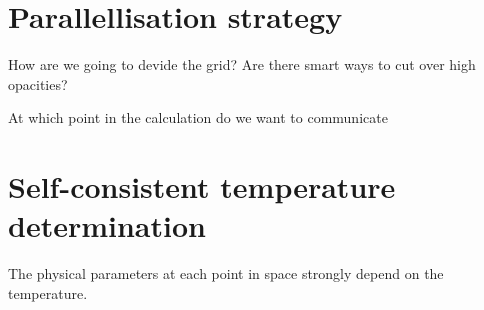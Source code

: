 \documentclass[]{article}
\begin{document}
\section{Parallellisation strategy}

How are we going to devide the grid? Are there smart ways to cut over high opacities?

\bigskip

At which point in the calculation do we want to communicate

\section{Self-consistent temperature determination}

The physical parameters at each point in space strongly depend on the temperature.




\end{document}
